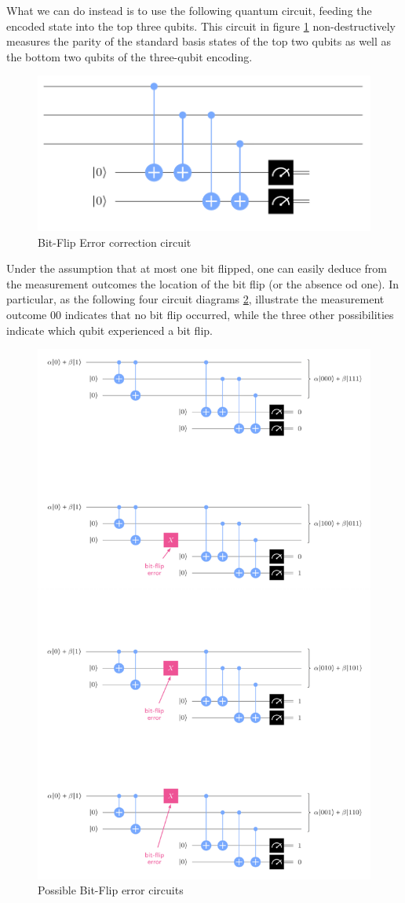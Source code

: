 \documentclass[12pt, oneside]{book}
\theoremstyle{definition}
\theoremstyle{definition}
\theoremstyle{remark}
\begin{document}
What we can do instead is to use the following quantum circuit, feeding the encoded state into the top three qubits. This circuit in figure \ref{fig:bitfliperr} non-destructively measures the parity of the standard basis states of the top two qubits as well as the bottom two qubits of the three-qubit encoding.
\begin{figure}[ht]
    \centering
    \includegraphics[width=1\linewidth]{Images/possbitflipcircs.png}
    \caption{Bit-Flip Error correction circuit}
    \label{fig:bitfliperr}
\end{figure}
Under the assumption that at most one bit flipped, one can easily deduce from the measurement outcomes the location of the bit flip (or the absence od one). In particular, as the following four circuit diagrams \ref{fig:possbitflip}, illustrate the measurement outcome $00$ indicates that no bit flip occurred, while the three other possibilities indicate which qubit experienced a bit flip.
\begin{figure}[ht]
    \centering
    \includegraphics[width=0.75\linewidth]{Images/possbitflip.png}
    \caption{Possible Bit-Flip error circuits}
    \label{fig:possbitflip}
\end{figure}
\end{document}
